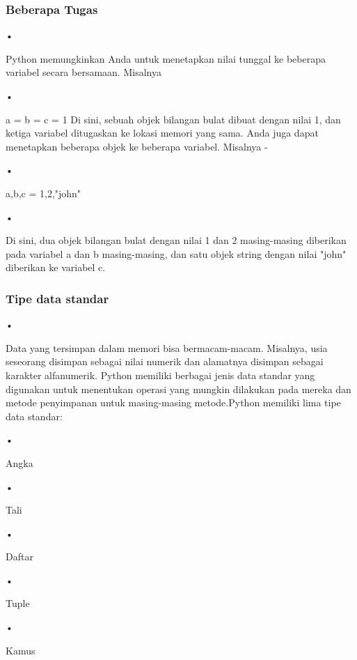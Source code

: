 \documentclass{wileySix}
\begin{document}
\subsubsection{Beberapa Tugas}
\begin{flushleft}
•
\end{flushleft}Python memungkinkan Anda untuk menetapkan nilai tunggal ke beberapa variabel secara bersamaan. Misalnya \begin{flushleft}
•
\end{flushleft}a = b = c = 1
Di sini, sebuah objek bilangan bulat dibuat dengan nilai 1, dan ketiga variabel ditugaskan ke lokasi memori yang sama. Anda juga dapat menetapkan beberapa objek ke beberapa variabel. Misalnya -
\begin{flushleft}
•
\end{flushleft}a,b,c = 1,2,"john"
\begin{flushleft}
•
\end{flushleft}Di sini, dua objek bilangan bulat dengan nilai 1 dan 2 masing-masing diberikan pada variabel a dan b masing-masing, dan satu objek string dengan nilai "john" diberikan ke variabel c.

\subsubsection{Tipe data standar}
\begin{flushleft}
•
\end{flushleft}Data yang tersimpan dalam memori bisa bermacam-macam. Misalnya, usia seseorang disimpan sebagai nilai numerik dan alamatnya disimpan sebagai karakter alfanumerik. Python memiliki berbagai jenis data standar yang digunakan untuk menentukan operasi yang mungkin dilakukan pada mereka dan metode penyimpanan untuk masing-masing metode.Python memiliki lima tipe data standar:
\begin{flushleft}
•
\end{flushleft}Angka
\begin{flushleft}
•
\end{flushleft}Tali
\begin{flushleft}
•
\end{flushleft}Daftar
\begin{flushleft}
•
\end{flushleft}Tuple
\begin{flushleft}
•
\end{flushleft}Kamus
\end{document}
